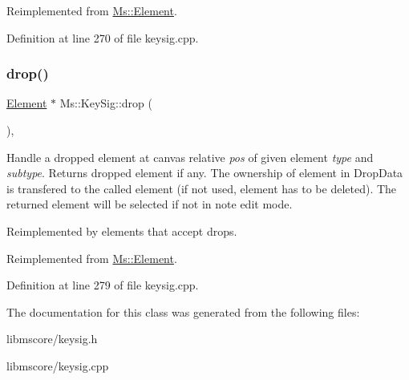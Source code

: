 Reimplemented from \hyperlink{class_ms_1_1_element_a35614445f0bc2212cbcc75c3f5810543}{Ms\+::\+Element}.



Definition at line 270 of file keysig.\+cpp.

\mbox{\label{class_ms_1_1_key_sig_aa151797b5a5391bdd93b07d754ab370e}} 
\subsubsection{\texorpdfstring{drop()}{drop()}}
{\footnotesize\ttfamily \hyperlink{class_ms_1_1_element}{Element} $\ast$ Ms\+::\+Key\+Sig\+::drop (\begin{DoxyParamCaption}\item[{\hyperlink{class_ms_1_1_edit_data}{Edit\+Data} \&}]{ }\end{DoxyParamCaption})\hspace{0.3cm}{\ttfamily [override]}, {\ttfamily [virtual]}}

Handle a dropped element at canvas relative {\itshape pos} of given element {\itshape type} and {\itshape subtype}. Returns dropped element if any. The ownership of element in Drop\+Data is transfered to the called element (if not used, element has to be deleted). The returned element will be selected if not in note edit mode.

Reimplemented by elements that accept drops. 

Reimplemented from \hyperlink{class_ms_1_1_element_a0ca69a9fb48e7b9fb481aacaf3860032}{Ms\+::\+Element}.



Definition at line 279 of file keysig.\+cpp.



The documentation for this class was generated from the following files\+:\begin{DoxyCompactItemize}
\item 
libmscore/keysig.\+h\item 
libmscore/keysig.\+cpp\end{DoxyCompactItemize}
